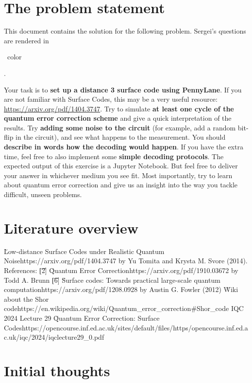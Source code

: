 \section{The problem statement}

This document contains the solution for the following problem. Sergei's questions are rendered in
\begin{\QuestionColor}\QuestionColorName\ color\end{\QuestionColor}.

\vsp

Your task is to \textbf{set up a distance 3 surface code using PennyLane}. If you are not familiar
with Surface Codes, this may be a very useful resource: \url{https://arxiv.org/pdf/1404.3747}. Try
to simulate \textbf{at least one cycle of the quantum error correction scheme} and give a quick
interpretation of the results. Try \textbf{adding some noise to the circuit} (for example, add a
random bit-flip in the circuit), and see what happens to the measurement. You should
\textbf{describe in words how the decoding would happen}. If you have the extra time, feel free to
also implement some \textbf{simple decoding protocols}. The expected output of this exercise is a
Jupyter Notebook. But feel free to deliver your answer in whichever medium you see fit. Most
importantly, try to learn about quantum error correction and give us an insight into the way you
tackle difficult, unseen problems.


\section{Literature overview}

\ls \u{Low-distance Surface Codes under Realistic Quantum Noise}{https://arxiv.org/pdf/1404.3747}
    by Yu Tomita and Krysta M. Svore (2014). References:
    \ls \t{[2]} \u{Quantum Error Correction}{https://arxiv.org/pdf/1910.03672}
        by Todd A. Brunn
    \li \t{[6]} \u{Surface codes: Towards practical large-scale quantum computation}{https://arxiv.org/pdf/1208.0928}
        by Austin G. Fowler (2012)
    \le
\li \u{Wiki about the Shor code}{https://en.wikipedia.org/wiki/Quantum_error_correction\#Shor_code}
\li IQC 2024 Lecture 29 \u{Quantum Error Correction: Surface Codes}{https://opencourse.inf.ed.ac.uk/sites/default/files/https/opencourse.inf.ed.ac.uk/iqc/2024/iqclecture29_0.pdf}
\li {}
\le



\section{Initial thoughts}


